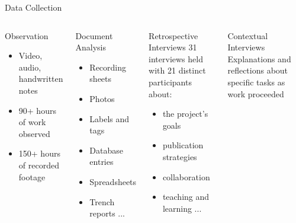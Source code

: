 \documentclass{beamer}
\begin{document}
\begin{frame}{Data Collection}
  \begin{columns}[T,onlytextwidth]
    \begin{block}{Observation}
      \begin{itemize}
        \item Video, audio, handwritten notes
        \item 90+ hours of work observed
        \item 150+ hours of recorded footage
      \end{itemize}
    \end{block}

    \begin{block}{Document Analysis}
      \begin{itemize}
        \item Recording sheets
        \item Photos
        \item Labels and tags
        \item Database entries
        \item Spreadsheets
        \item Trench reports ...
      \end{itemize}
    \end{block}


    \begin{block}{Retrospective Interviews}
      31 interviews held with 21 distinct participants about:
      \begin{itemize}
        \item the project’s goals
        \item publication strategies
        \item collaboration
        \item teaching and learning ...
      \end{itemize}
    \end{block}

    \begin{block}{Contextual Interviews}
      Explanations and reflections about specific tasks as work proceeded
    \end{block}

  \end{columns}

\end{frame}
\end{document}
